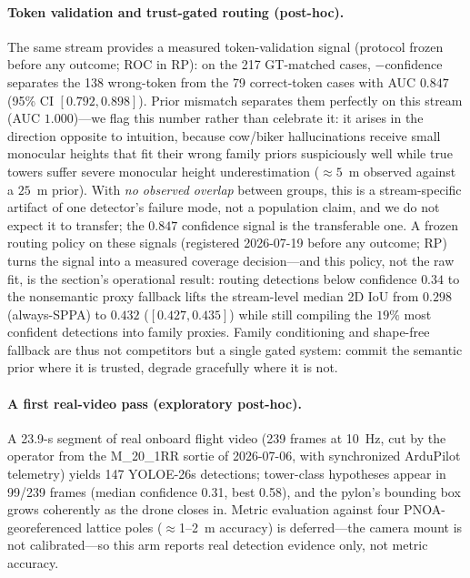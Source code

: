 \documentclass[11pt,a4paper]{article}
\begin{document}
\paragraph{Token validation and trust-gated routing (post-hoc).}
The same stream provides a measured token-validation signal (protocol frozen
before any outcome; ROC in RP):
on the 217 GT-matched cases,
\(-\)confidence separates the 138 wrong-token from the 79 correct-token cases
with AUC \(0.847\) (95\% CI \([0.792,0.898]\)). Prior mismatch separates
them perfectly on this stream (AUC \(1.000\))---we flag this number rather
than celebrate it: it arises in the direction opposite to intuition, because
cow/biker hallucinations receive small monocular heights that fit their
wrong family priors suspiciously well while true towers suffer severe
monocular height underestimation
(\(\approx\)\(5\)~m observed against a \(25\)~m prior). With \emph{no
observed overlap} between groups, this is a stream-specific artifact of one
detector's failure mode, not a population claim, and we do not expect it to
transfer; the \(0.847\) confidence signal is the transferable one. A frozen
routing policy on these signals
(registered 2026-07-19 before any outcome; RP) turns the signal into a
measured coverage decision---and this policy, not the raw fit, is the
section's operational result:
routing detections below confidence \(0.34\) to the nonsemantic proxy
fallback lifts the stream-level median 2D IoU from
\(0.298\) (always-SPPA) to \(0.432\) (\([0.427,0.435]\)) while still
compiling the \(19\%\) most confident detections into family proxies.
Family conditioning and shape-free fallback are thus not competitors but a
single gated system: commit the semantic prior where it is trusted, degrade
gracefully where it is not.

\paragraph{A first real-video pass (exploratory post-hoc).}
A 23.9-s segment of real onboard flight video (239 frames at 10~Hz, cut by
the operator from the M\_20\_1RR sortie of 2026-07-06, with synchronized
ArduPilot telemetry) yields 147 YOLOE-26s detections; tower-class
hypotheses appear in 99/239 frames (median confidence 0.31, best 0.58),
and the pylon's bounding box grows coherently as the drone closes in.
Metric evaluation against four PNOA-georeferenced lattice poles
(\(\approx\)1--2~m accuracy) is deferred---the camera mount is not
calibrated---so this arm reports real
detection evidence only, not metric accuracy.
\end{document}
